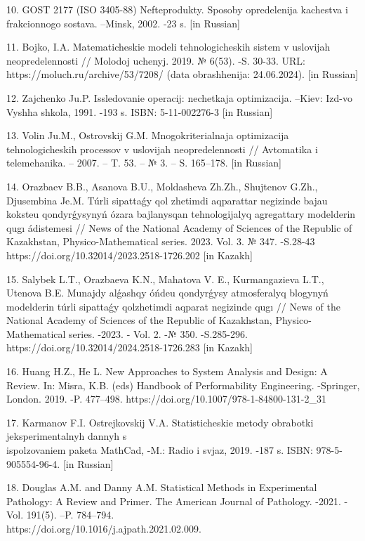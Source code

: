 \begin{noparindent}
10. GOST 2177 (ISO 3405-88) Nefteprodukty. Sposoby opredelenija
kachestva i frakcionnogo sostava. --Minsk, 2002. -23 s. {[}in Russian{]}

11. Bojko, I.A. Matematicheskie modeli tehnologicheskih sistem v
uslovijah neopredelennosti // Molodoj uchenyj. 2019. № 6(53). -S. 30-33.
URL: https://moluch.ru/archive/53/7208/ (data obrashhenija: 24.06.2024).
{[}in Russian{]}

12. Zajchenko Ju.P. Issledovanie operacij: nechetkaja optimizacija.
--Kiev: Izd-vo Vyshha shkola, 1991. -193 s. ISBN: 5-11-002276-3 {[}in
Russian{]}

13. Volin Ju.M., Ostrovskij G.M. Mnogokriterial\textquotesingle naja
optimizacija tehnologicheskih processov v uslovijah neopredelennosti //
Avtomatika i telemehanika. -- 2007. -- T. 53. -- № 3. -- S. 165--178.
{[}in Russian{]}

14. Orazbaev B.B., Asanova B.U., Moldasheva Zh.Zh., Shujtenov G.Zh.,
Djusembina Je.M. Túrli sipattaǵy qol zhetimdi aqparattar negizinde bajau
koksteu qondyrǵysynyń ózara bajlanysqan tehnologijalyq agregattary
model\textquotesingle derin qugı ádistemesi // News of the National
Academy of Sciences of the Republic of Kazakhstan, Physico-Mathematical
series. 2023. Vol. 3. № 347. -S.28-43
https://doi.org/10.32014/2023.2518-1726.202 {[}in Kazakh{]}

15. Salybek L.T., Orazbaeva K.N., Mahatova V. E., Kurmangazieva L.T.,
Utenova B.E. Munajdy alǵashqy óńdeu qondyrǵysy atmosferalyq blogynyń
model\textquotesingle derin túrli sipattaǵy qolzhetimdi aqparat
negizinde qugı // News of the National Academy of Sciences of the
Republic of Kazakhstan, Physico-Mathematical series. -2023. - Vol. 2. -№
350. -S.285-296. https://doi.org/10.32014/2024.2518-1726.283 {[}in
Kazakh{]}

16. Huang H.Z., He L. New Approaches to System Analysis and Design: A
Review. In: Misra, K.B. (eds) Handbook of Performability Engineering.
-Springer, London. 2019. -P. 477--498.
https://doi.org/10.1007/978-1-84800-131-2\_31

17. Karmanov F.I. Ostrejkovskij V.A. Statisticheskie metody obrabotki
jeksperimental\textquotesingle nyh dannyh s \\
ispol\textquotesingle zovaniem paketa MathCad, -M.: Radio i
svjaz\textquotesingle, 2019. -187 s. ISBN: 978-5-905554-96-4. {[}in
Russian{]}

18. Douglas A.M. and Danny A.M. Statistical Methods in Experimental
Pathology: A Review and Primer. The American Journal of Pathology.
-2021. -Vol. 191(5). --P. 784--794. \\
https://doi.org/10.1016/j.ajpath.2021.02.009.


\end{noparindent}
